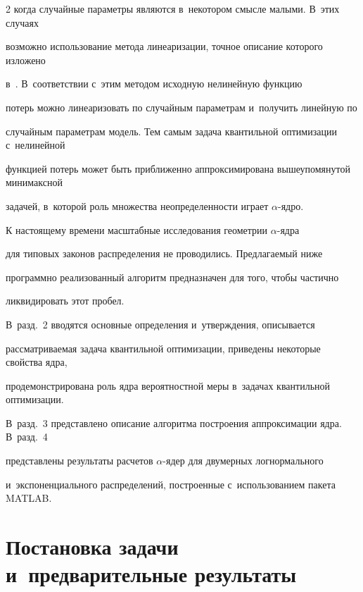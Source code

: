 \begin{multicols}{2}
когда случайные па\-ра\-мет\-ры являются в~некотором смысле малыми. В~этих случаях 

возможно использование метода линеаризации, точ\-ное описание которого изложено 

в~\cite{vaskan2}. В~соответствии с~этим методом исходную нелинейную функцию 

потерь можно линеаризовать по случайным па\-ра\-мет\-рам и~получить линейную по 

случайным па\-ра\-мет\-рам модель. Тем самым задача квантильной оптимизации с~нелинейной 

функцией потерь может быть приближенно аппроксимирована вышеупомянутой ми\-ни\-макс\-ной 

задачей, в~которой роль множества не\-опре\-де\-лен\-ности играет $\alpha$-ядро.



К настоящему времени мас\-штаб\-ные исследования гео\-мет\-рии $\alpha$-яд\-ра 

для типовых законов распределения не проводились. Предлагаемый ниже 

программно реализованный алгоритм предназначен для того, чтобы час\-тич\-но 

ликвидировать этот пробел.





В~разд.~2 вводятся основные определения и~утверж\-де\-ния, описывается 

рас\-смат\-ри\-ва\-емая задача кван\-тиль\-ной оптимизации, приведены некоторые свойства ядра, 

продемонстрирована роль ядра вероятностной меры в~задачах квантильной оптимизации. 

В~разд.~3 пред\-став\-ле\-но описание алгоритма по\-стро\-ения аппроксимации ядра. В~разд.~4 

представлены результаты рас\-че\-тов $\alpha$-ядер для двумерных логнормального 

и~экспоненциального рас\-пре\-де\-ле\-ний, по\-стро\-ен\-ные с~использованием пакета MATLAB.





\section{Постановка задачи и~предварительные результаты}



\noindent


\end{multicols}
